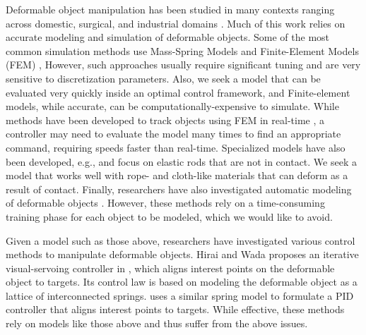 Deformable object manipulation has been studied in many contexts ranging across domestic, surgical, and industrial domains \cite{Jimenez2012}. Much of this work relies on accurate modeling and simulation of deformable objects. Some of the most common simulation methods use Mass-Spring Models \cite{Essahbi2012, Maris2010} and Finite-Element Models (FEM) \cite{Muller2002}, However, such approaches usually require significant tuning and are very sensitive to discretization parameters. Also, we seek a model that can be evaluated very quickly inside an optimal control framework, and Finite-element models, while accurate, can be computationally-expensive to simulate. While methods have been developed to track objects using FEM in real-time \cite{Petit2017}, a controller may need to evaluate the model many times to find an appropriate command, requiring speeds faster than real-time. Specialized models have also been developed, e.g., \cite{Borum2014} and \cite{Bretl2014} focus on elastic rods that are not in contact. We seek a model that works well with rope- and cloth-like materials that can deform as a result of contact. Finally, researchers have also investigated automatic modeling of deformable objects \cite{Lang2002, Cretu2008}. However, these methods rely on a time-consuming training phase for each object to be modeled, which we would like to avoid.%

Given a model such as those above, researchers have investigated various control methods to manipulate deformable objects. %
Hirai and Wada proposes an iterative visual-servoing controller in \cite{Hirai2000}, which aligns interest points on the deformable object to targets. 
Its control law is based on modeling the deformable object as a lattice of interconnected springs. 
\cite{Wada2001} uses a similar spring model to formulate a PID controller that aligns interest points to targets. While effective, these methods rely on models like those above and thus suffer from the above issues.


